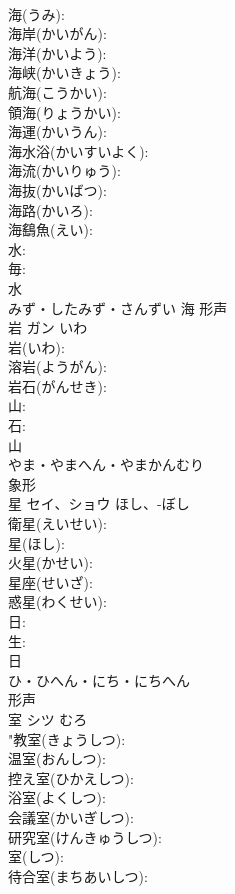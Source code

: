 \documentclass[8pt]{extreport}
\begin{document}
\begin{CJK}{UTF8}{min}
\\	海(うみ): 
\\	海岸(かいがん): 
\\	海洋(かいよう): 
\\	海峡(かいきょう): 
\\	航海(こうかい): 
\\	領海(りょうかい): 
\\	海運(かいうん): 
\\	海水浴(かいすいよく): 
\\	海流(かいりゅう): 
\\	海抜(かいばつ): 
\\	海路(かいろ): 
\\	海鷂魚(えい): 
\\	水: 
\\	毎: 
\\	水	
\\	みず・したみず・さんずい	海	形声 
\\	岩	ガン	いわ		
\\	岩(いわ): 
\\	溶岩(ようがん): 
\\	岩石(がんせき): 
\\	山: 
\\	石: 
\\	山	
\\	やま・やまへん・やまかんむり	
\\	象形 
\\	星	セイ、ショウ	ほし、-ぼし		
\\	衛星(えいせい): 
\\	星(ほし): 
\\	火星(かせい): 
\\	星座(せいざ): 
\\	惑星(わくせい): 
\\	日: 
\\	生: 
\\	日	
\\	ひ・ひへん・にち・にちへん	
\\	形声 
\\	室	シツ	むろ		
\\	"教室(きょうしつ): 
\\	温室(おんしつ): 
\\	控え室(ひかえしつ): 
\\	浴室(よくしつ): 
\\	会議室(かいぎしつ): 
\\	研究室(けんきゅうしつ): 
\\	室(しつ): 
\\	待合室(まちあいしつ): 

\end{CJK}
\end{document}
